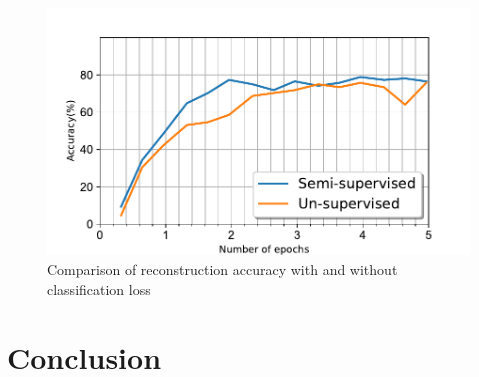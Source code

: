 \documentclass{uai2021} %
\begin{document}
\begin{figure}[!t]
\centering
\includegraphics[width=\linewidth]{reconstruction_accuracy_different_runs}
\caption{Comparison of reconstruction accuracy with and without classification loss }
\label{reconstruction_accuracy_sup_vs_unsup}
\end{figure}

\section{Conclusion}

%
%
\end{document}
